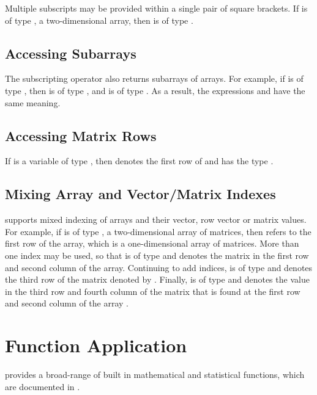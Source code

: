 Multiple subscripts may be provided within a single pair of square
brackets.  If  is of type , a two-dimensional
array, then  is of type .

\subsection{Accessing Subarrays}

The subscripting operator also returns subarrays of arrays.  For
example, if  is of type , then 
is of type , and  is of type
.  As a result, the expressions  and
 have the same meaning.  

\subsection{Accessing Matrix Rows}

If  is a variable of type , then
 denotes the first row of  and has the
type .  

\subsection{Mixing Array and Vector/Matrix Indexes}

\Stan supports mixed indexing of arrays and their vector, row vector
or matrix values.  For example, if  is of type
, a two-dimensional array of matrices, then
 refers to the first row of the array, which is a
one-dimensional array of matrices.  More than one index may be used,
so that  is of type  and denotes the matrix
in the first row and second column of the array.  Continuing to add
indices,  is of type  and denotes
the third row of the matrix denoted by .  Finally,
 is of type  and denotes the value in the
third row and fourth column of the matrix that is found at the first
row and second column of the array .

\section{Function Application}

\Stan provides a broad-range of built in mathematical and statistical
functions, which are documented in .

